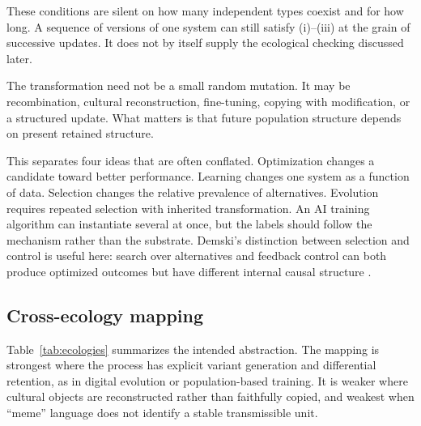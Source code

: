 \documentclass[11pt]{article}
\begin{document}
These conditions are silent on how many independent types coexist and for how long. A sequence of versions of one system can still satisfy (i)--(iii) at the grain of successive updates. It does not by itself supply the ecological checking discussed later.

The transformation need not be a small random mutation. It may be recombination, cultural reconstruction, fine-tuning, copying with modification, or a structured update. What matters is that future population structure depends on present retained structure.

This separates four ideas that are often conflated. Optimization changes a candidate toward better performance. Learning changes one system as a function of data. Selection changes the relative prevalence of alternatives. Evolution requires repeated selection with inherited transformation. An AI training algorithm can instantiate several at once, but the labels should follow the mechanism rather than the substrate. Demski's distinction between selection and control is useful here: search over alternatives and feedback control can both produce optimized outcomes but have different internal causal structure \parencite{demski2019}.

\subsection{Cross-ecology mapping}

Table~\ref{tab:ecologies} summarizes the intended abstraction. The mapping is strongest where the process has explicit variant generation and differential retention, as in digital evolution or population-based training. It is weaker where cultural objects are reconstructed rather than faithfully copied, and weakest when ``meme'' language does not identify a stable transmissible unit.
\end{document}
